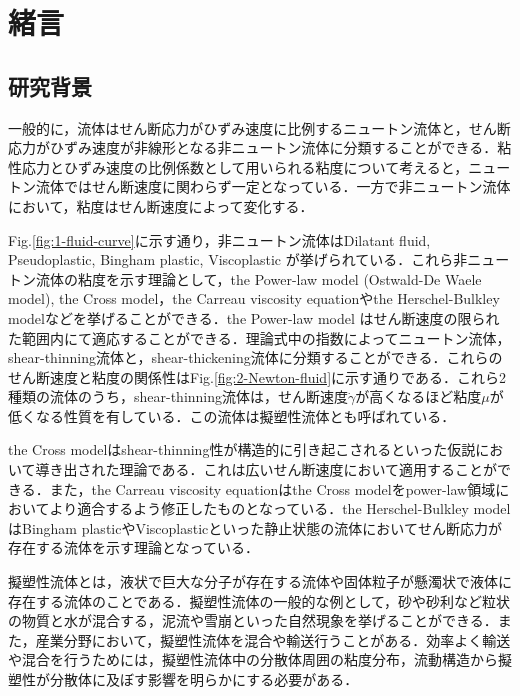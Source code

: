 \section{緒言}

\subsection{研究背景}
一般的に，流体はせん断応力がひずみ速度に比例するニュートン流体と，せん断応力がひずみ速度が非線形となる非ニュートン流体に分類することができる．粘性応力とひずみ速度の比例係数として用いられる粘度について考えると，ニュートン流体ではせん断速度に関わらず一定となっている．一方で非ニュートン流体において，粘度はせん断速度によって変化する．

Fig.\ref{fig:1-fluid-curve}に示す通り，非ニュートン流体はDilatant fluid, Pseudoplastic, Bingham plastic, Viscoplastic が挙げられている．これら非ニュートン流体の粘度を示す理論として，the Power-law model (Ostwald-De Waele model), the Cross model，the Carreau viscosity equationやthe Herschel-Bulkley modelなどを挙げることができる\cite{ref:1}．the Power-law model はせん断速度の限られた範囲内にて適応することができる．理論式中の指数によってニュートン流体，shear-thinning流体と，shear-thickening流体に分類することができる．これらのせん断速度と粘度の関係性はFig.\ref{fig:2-Newton-fluid}に示す通りである．これら2種類の流体のうち，shear-thinning流体は，せん断速度$\dot{\gamma}$が高くなるほど粘度$\mu$が低くなる性質を有している．この流体は擬塑性流体とも呼ばれている．

the Cross modelはshear-thinning性が構造的に引き起こされるといった仮説において導き出された理論である．これは広いせん断速度において適用することができる．また，the Carreau viscosity equationはthe Cross modelをpower-law領域においてより適合するよう修正したものとなっている．the Herschel-Bulkley modelはBingham plasticやViscoplasticといった静止状態の流体においてせん断応力が存在する流体を示す理論となっている\cite{ref:1}．

擬塑性流体とは，液状で巨大な分子が存在する流体や固体粒子が懸濁状で液体に存在する流体のことである．擬塑性流体の一般的な例として，砂や砂利など粒状の物質と水が混合する，泥流や雪崩といった自然現象を挙げることができる．また，産業分野において，擬塑性流体を混合や輸送行うことがある．効率よく輸送や混合を行うためには，擬塑性流体中の分散体周囲の粘度分布，流動構造から擬塑性が分散体に及ぼす影響を明らかにする必要がある．

